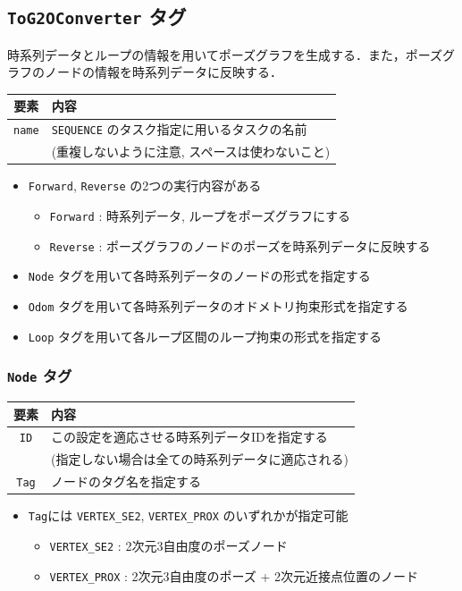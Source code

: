 \documentclass[dvipdfmx]{jsarticle}
\begin{document}
\clearpage
\cprotect \subsection{\verb|ToG2OConverter| タグ}
時系列データとループの情報を用いてポーズグラフを生成する．また，ポーズグラフのノードの情報を時系列データに反映する．

\begin{tabular}{c|l}
	\hline
	要素 & 内容 \\
	\hline \hline
	\verb|name| & \verb|SEQUENCE| のタスク指定に用いるタスクの名前 \vspace{-5pt}\\
		& (重複しないように注意, スペースは使わないこと) \\
	\hline
\end{tabular}

\begin{itemize}
	\item \verb|Forward|, \verb|Reverse| の2つの実行内容がある
	\begin{itemize}
		\item[] \verb|Forward| : 時系列データ, ループをポーズグラフにする
		\item[] \verb|Reverse| :  ポーズグラフのノードのポーズを時系列データに反映する
	\end{itemize}
	\item \verb|Node| タグを用いて各時系列データのノードの形式を指定する
	\item \verb|Odom| タグを用いて各時系列データのオドメトリ拘束形式を指定する
	\item \verb|Loop| タグを用いて各ループ区間のループ拘束の形式を指定する
\end{itemize}

\cprotect \subsubsection{\verb|Node| タグ}
\begin{tabular}{c|l}
	\hline
	要素 & 内容 \\
	\hline \hline
	\verb|ID| & この設定を適応させる時系列データIDを指定する \vspace{-5pt}\\
		& (指定しない場合は全ての時系列データに適応される) \\
	\verb|Tag| & ノードのタグ名を指定する \\
	\hline
\end{tabular}

\begin{itemize}
	\item \verb|Tag|には \verb|VERTEX_SE2|, \verb|VERTEX_PROX| のいずれかが指定可能
	\begin{itemize}
		\item[] \verb|VERTEX_SE2| : 2次元3自由度のポーズノード
		\item[] \verb|VERTEX_PROX| : 2次元3自由度のポーズ + 2次元近接点位置のノード
	\end{itemize}
\end{itemize}
\end{document}
